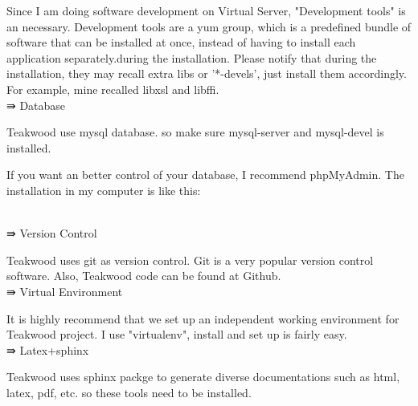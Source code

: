 Since I am doing software development on Virtual Server, "Development tools" is an necessary. Development tools are a yum group, which is a predefined bundle of software that can be installed at once, instead of having to install each application separately.during the installation. Please notify that during the installation, they may recall extra libs or '*-devels', just install them accordingly. For example, mine recalled libxsl and libffi.
\\
⇛ Database

Teakwood use mysql database. so make sure mysql-server and mysql-devel is installed.

If you want an better control of your database, I recommend phpMyAdmin. The installation in my computer is like this:

\\
⇛ Version Control

Teakwood uses git as version control. Git is a very popular version control software. Also, Teakwood code can be found at Github.
\\
⇛ Virtual Environment

It is highly recommend that we set up an independent working environment for Teakwood project. I use "virtualenv", install and set up is fairly easy.
\\
⇛ Latex+sphinx

Teakwood uses sphinx packge to generate diverse documentations such as html, latex, pdf, etc. so these tools need to be installed.


